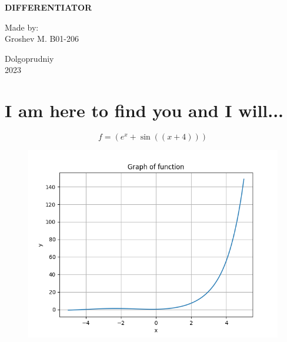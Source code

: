 \documentclass[a4paper, 12pt]{article}
\title{}
\date{}
\begin{document}

    \begin{titlepage}
    \maketitle
    \thispagestyle{empty}

            \begin{center}
                  \Large \textbf{DIFFERENTIATOR}
            \end{center}

             \vspace{20em}
             \begin{flushright}
                 \normalsize Made by: \\
                             Groshev M. B01-206
             \end{flushright}

             \begin{center}
                    \vfill \normalsize Dolgoprudniy \\ 2023
             \end{center}
    \end{titlepage}


\section{I am here to find you and I will...}\begin{equation*}
    f = ({{{e}}^{{x}}}+{\sin({({{x}}+{{4}})})})
\end{equation*}

\begin{figure}[h!]
        \centering
         \includegraphics[scale=0.5]{./LaTeX/tex_pics/func.png}
\end{figure}
\end{document}
